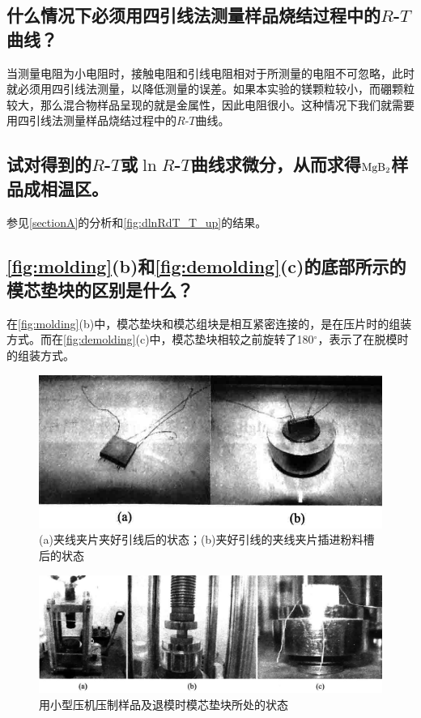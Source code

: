 \documentclass[font=default]{mpltx}
\begin{document}
\subsection{什么情况下必须用四引线法测量样品烧结过程中的$R$-$T$曲线？}
当测量电阻为小电阻时，接触电阻和引线电阻相对于所测量的电阻不可忽略，此时就必须用四引线法测量，以降低测量的误差。如果本实验的镁颗粒较小，而硼颗粒较大，那么混合物样品呈现的就是金属性，因此电阻很小。这种情况下我们就需要用四引线法测量样品烧结过程中的$R$-$T$曲线。
\subsection{试对得到的$R$-$T$或$\ln R$-$T$曲线求微分，从而求得${\rm MgB_2}$样品成相温区。}
参见\autoref{sectionA}的分析和\autoref{fig:dlnRdT_T_up}的结果。
\subsection{\autoref{fig:molding}(b)和\autoref{fig:demolding}(c)的底部所示的模芯垫块的区别是什么？}
在\autoref{fig:molding}(b)中，模芯垫块和模芯组块是相互紧密连接的，是在压片时的组装方式。而在\autoref{fig:demolding}(c)中，模芯垫块相较之前旋转了180$^\circ$，表示了在脱模时的组装方式。
\begin{figure}[h]
  \centering
  \setlength{\abovecaptionskip}{-0.2cm}
  \includegraphics[width=0.47\linewidth]{fig/molding.png}
  \caption{(a)夹线夹片夹好引线后的状态；(b)夹好引线的夹线夹片插进粉料槽后的状态}
  \label{fig:molding}
\end{figure}
\begin{figure}[h]
  \centering
  \setlength{\abovecaptionskip}{-0.2cm}
  \includegraphics[width=0.7\linewidth]{fig/demolding.png}
  \caption{用小型压机压制样品及退模时模芯垫块所处的状态}
  \label{fig:demolding}
\end{figure}
\end{document}
